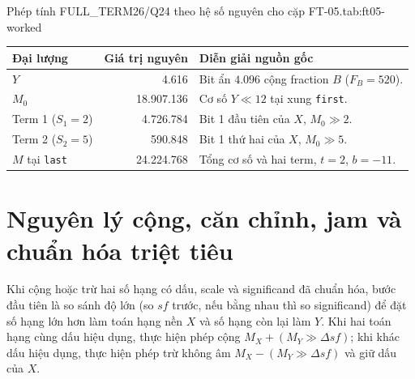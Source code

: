 \begin{engineeringtable}{Phép tính FULL\_TERM26/Q24 theo hệ số nguyên cho cặp FT-05.}{tab:ft05-worked}
\begin{tabularx}{\linewidth}{@{}>{\raggedright\arraybackslash}p{34mm}r Y@{}}
\toprule
Đại lượng & Giá trị nguyên & Diễn giải nguồn gốc \\
\midrule
$Y$ & 4.616 & Bit ẩn $4.096$ cộng fraction $B$ ($F_B = 520$). \\
$M_0$ & 18.907.136 & Cơ số $Y \ll 12$ tại xung \texttt{first}. \\
Term 1 ($S_1=2$) & 4.726.784 & Bit 1 đầu tiên của $X$, $M_0 \gg 2$. \\
Term 2 ($S_2=5$) & 590.848 & Bit 1 thứ hai của $X$, $M_0 \gg 5$. \\
$M$ tại \texttt{last} & 24.224.768 & Tổng cơ số và hai term, $t=2$, $b=-11$. \\
\bottomrule
\end{tabularx}
\end{engineeringtable}

\section{Nguyên lý cộng, căn chỉnh, jam và chuẩn hóa triệt tiêu}

Khi cộng hoặc trừ hai số hạng có dấu, scale và significand đã chuẩn hóa, bước
đầu tiên là so sánh độ lớn (so $sf$ trước, nếu bằng nhau thì so significand) để
đặt số hạng lớn hơn làm toán hạng nền $X$ và số hạng còn lại làm $Y$. Khi hai
toán hạng cùng dấu hiệu dụng, thực hiện phép cộng $M_X + (M_Y \gg \Delta sf)$;
khi khác dấu hiệu dụng, thực hiện phép trừ không âm $M_X - (M_Y \gg \Delta sf)$
và giữ dấu của $X$.

